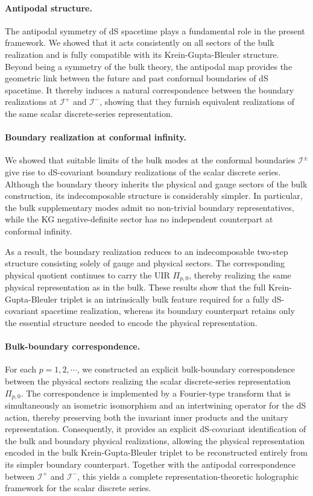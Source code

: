 \documentclass[aps,twocolumn,nofootinbib]{revtex4}
\begin{document}
{\paragraph{Antipodal structure.} The antipodal symmetry of dS spacetime plays a fundamental role in the present framework. We showed that it acts consistently on all sectors of the bulk realization and is fully compatible with its Krein-Gupta-Bleuler structure. Beyond being a symmetry of the bulk theory, the antipodal map provides the geometric link between the future and past conformal boundaries of dS spacetime. It thereby induces a natural correspondence between the boundary realizations at ${\mathcal I}^+$ and ${\mathcal I}^-$, showing that they furnish equivalent realizations of the same scalar discrete-series representation.

\paragraph{Boundary realization at conformal infinity.} We showed that suitable limits of the bulk modes at the conformal boundaries ${\mathcal I}^{\pm}$ give rise to dS-covariant boundary realizations of the scalar discrete series. Although the boundary theory inherits the physical and gauge sectors of the bulk construction, its indecomposable structure is considerably simpler. In particular, the bulk supplementary modes admit no non-trivial boundary representatives, while the KG negative-definite sector has no independent counterpart at conformal infinity.

As a result, the boundary realization reduces to an indecomposable two-step structure consisting solely of gauge and physical sectors. The corresponding physical quotient continues to carry the UIR $\Pi_{p,0}$, thereby realizing the same physical representation as in the bulk. These results show that the full Krein-Gupta-Bleuler triplet is an intrinsically bulk feature required for a fully dS-covariant spacetime realization, whereas its boundary counterpart retains only the essential structure needed to encode the physical representation.

\paragraph{Bulk-boundary correspondence.} For each $p=1,2,\cdots$, we constructed an explicit bulk-boundary correspondence between the physical sectors realizing the scalar discrete-series representation $\Pi_{p,0}$. The correspondence is implemented by a Fourier-type transform that is simultaneously an isometric isomorphism and an intertwining operator for the dS action, thereby preserving both the invariant inner products and the unitary representation. Consequently, it provides an explicit dS-covariant identification of the bulk and boundary physical realizations, allowing the physical representation encoded in the bulk Krein-Gupta-Bleuler triplet to be reconstructed entirely from its simpler boundary counterpart. Together with the antipodal correspondence between ${\mathcal I}^{+}$ and ${\mathcal I}^{-}$, this yields a complete representation-theoretic holographic framework for the scalar discrete series.


}
\end{document}
